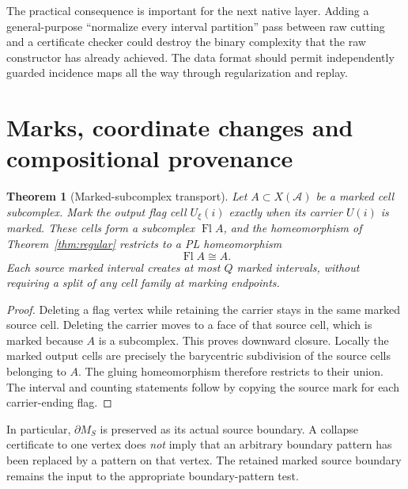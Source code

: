 \documentclass[11pt]{article}
\newtheorem{theorem}{Theorem}[section]
\theoremstyle{definition}\newtheorem{definition}[theorem]{Definition}
\theoremstyle{remark}\newtheorem{remark}[theorem]{Remark}
\newcommand{\Flag}{\operatorname{Fl}}
\newcommand{\Atlas}{\mathcal A}
\begin{document}
The practical consequence is important for the next native layer. Adding a general-purpose ``normalize every interval partition'' pass between raw cutting and a certificate checker could destroy the binary complexity that the raw constructor has already achieved. The data format should permit independently guarded incidence maps all the way through regularization and replay.

\section{Marks, coordinate changes and compositional provenance}
\label{sec:marks}

\begin{theorem}[Marked-subcomplex transport]\label{thm:marks}
Let \(A\subset X(\Atlas)\) be a marked cell subcomplex. Mark the output flag cell \(U_\xi(i)\) exactly when its carrier \(U(i)\) is marked. These cells form a subcomplex \(\Flag A\), and the homeomorphism of Theorem~\ref{thm:regular} restricts to a PL homeomorphism
\[
                            \Flag A\cong A.
\]
Each source marked interval creates at most \(Q\) marked intervals, without requiring a split of any cell family at marking endpoints.
\end{theorem}
\begin{proof}
Deleting a flag vertex while retaining the carrier stays in the same marked source cell. Deleting the carrier moves to a face of that source cell, which is marked because \(A\) is a subcomplex. This proves downward closure. Locally the marked output cells are precisely the barycentric subdivision of the source cells belonging to \(A\). The gluing homeomorphism therefore restricts to their union. The interval and counting statements follow by copying the source mark for each carrier-ending flag.
\end{proof}

In particular, \(\partial M_S\) is preserved as its actual source boundary. A collapse certificate to one vertex does \emph{not} imply that an arbitrary boundary pattern has been replaced by a pattern on that vertex. The retained marked source boundary remains the input to the appropriate boundary-pattern test.
\end{document}
